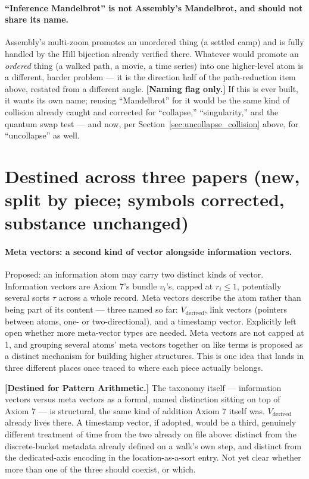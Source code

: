 \documentclass[11pt]{article}
\begin{document}
\paragraph{``Inference Mandelbrot'' is not Assembly's Mandelbrot, and
should not share its name.} Assembly's multi-zoom promotes an
unordered thing (a settled camp) and is fully handled by the Hill
bijection already verified there. Whatever would promote an
\emph{ordered} thing (a walked path, a movie, a time series) into one
higher-level atom is a different, harder problem --- it is the
direction half of the path-reduction item above, restated from a
different angle. \textbf{[Naming flag only.]} If this is ever built,
it wants its own name; reusing ``Mandelbrot'' for it would be the same
kind of collision already caught and corrected for ``collapse,''
``singularity,'' and the quantum swap test --- and now, per
Section~\ref{sec:uncollapse_collision} above, for ``uncollapse'' as
well.

\section{Destined across three papers (new, split by piece; symbols
corrected, substance unchanged)}

\paragraph{Meta vectors: a second kind of vector alongside information
vectors.} Proposed: an information atom may carry two distinct kinds
of vector. Information vectors are Axiom 7's bundle $v_i$'s, capped at
$r_i\le1$, potentially several sorts $\tau$ across a whole record.
Meta vectors describe the atom rather than being part of its content
--- three named so far: $V_{\text{derived}}$, link vectors (pointers
between atoms, one- or two-directional), and a timestamp vector.
Explicitly left open whether more meta-vector types are needed. Meta
vectors are not capped at 1, and grouping several atoms' meta vectors
together on like terms is proposed as a distinct mechanism for
building higher structures. This is one idea that lands in three
different places once traced to where each piece actually belongs.

\textbf{[Destined for Pattern Arithmetic.]} The taxonomy itself ---
information vectors versus meta vectors as a formal, named distinction
sitting on top of Axiom 7 --- is structural, the same kind of addition
Axiom 7 itself was. $V_{\text{derived}}$ already lives there. A
timestamp vector, if adopted, would be a third, genuinely different
treatment of time from the two already on file above: distinct from
the discrete-bucket metadata already defined on a walk's own step, and
distinct from the dedicated-axis encoding in the location-as-a-sort
entry. Not yet clear whether more than one of the three should
coexist, or which.
\end{document}
